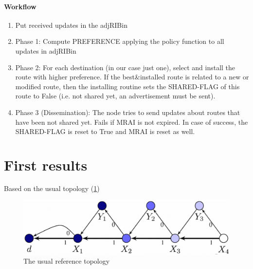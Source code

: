 \documentclass[fleqn,10pt]{SelfArx} %
\begin{document}
\paragraph{Workflow}
\begin{enumerate}[noitemsep]
  \item Put received updates in the adjRIBin
  \item Phase 1: Compute PREFERENCE applying the policy function to all updates in adjRIBin 
  \item Phase 2: For each destination (in our case just one), select and install the route with higher preference. 
    	If the best\&installed route is related to a new or modified route, then the installing routine sets the 
    	SHARED-FLAG of this route to False (i.e. not shared yet, an advertisement must be sent).
  \item Phase 3 (Dissemination): The node tries to send updates about routes that have been not shared yet. Fails if MRAI is not expired.
  		In case of success, the SHARED-FLAG is reset to True and MRAI is reset as well.
\end{enumerate}

\section{First results}

Based on the usual topology (\cref{})
\begin{figure}[ht]
\centering
\includegraphics[width=\linewidth]{figures/fabrex.png}
\caption{The usual reference topology}
\label{fig:decisionprocess}
\end{figure}




\end{document}
